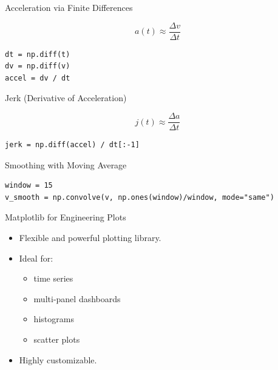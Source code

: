 \documentclass[aspectratio=169]{beamer}
\begin{document}
\begin{frame}[fragile]{Acceleration via Finite Differences}

\begin{equation}
a(t) \approx \frac{\Delta v}{\Delta t}
\end{equation}

\begin{verbatim}
dt = np.diff(t)
dv = np.diff(v)
accel = dv / dt
\end{verbatim}
\end{frame}

\begin{frame}[fragile]{Jerk (Derivative of Acceleration)}

\begin{equation}
j(t) \approx \frac{\Delta a}{\Delta t}
\end{equation}

\begin{verbatim}
jerk = np.diff(accel) / dt[:-1]
\end{verbatim}
\end{frame}

\begin{frame}[fragile]{Smoothing with Moving Average}
\begin{verbatim}
window = 15
v_smooth = np.convolve(v, np.ones(window)/window, mode="same")
\end{verbatim}
\end{frame}

\begin{frame}{Matplotlib for Engineering Plots}
  \begin{itemize}
    \item Flexible and powerful plotting library.
    \item Ideal for:
      \begin{itemize}
        \item time series
        \item multi-panel dashboards
        \item histograms
        \item scatter plots
      \end{itemize}
    \item Highly customizable.
  \end{itemize}
\end{frame}
\end{document}

